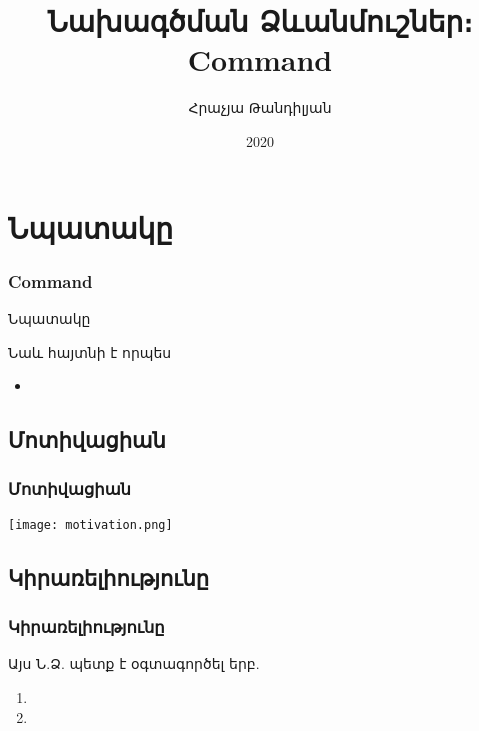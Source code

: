 \documentclass{beamer}
\begin{document}
\title[Command]{Նախագծման Ձևանմուշներ։ Command}
\author[Հրաչյա Թանդիլյան\copyright]{Հրաչյա Թանդիլյան}
\date{2020}

\begin{frame}
\titlepage
\end{frame}

\section{Նպատակը}
\begin{frame}\frametitle{Command}
\begin{block}{Նպատակը}

\end{block}
\vfill
Նաև հայտնի է որպես
\begin{itemize}
    \item 
\end{itemize}
\end{frame}

\subsection{Մոտիվացիան}
\begin{frame}\frametitle{Մոտիվացիան}
\begin{center}
    \texttt{[image: motivation.png]}
\end{center}
\end{frame}

\subsection{Կիրառելիությունը}
\begin{frame}\frametitle{Կիրառելիությունը}
Այս Ն.Ձ. պետք է օգտագործել երբ.
\vfill
\begin{enumerate}
    \item  \pause \vfill
    \item
\end{enumerate}
\end{frame}
\end{document}
